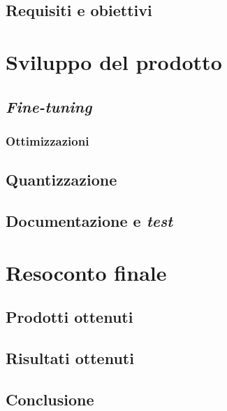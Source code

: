     \subsection{Requisiti e obiettivi}


\section{Sviluppo del prodotto}
    \subsection{\textit{Fine-tuning}}
        \subsubsection{Ottimizzazioni}
    \subsection{Quantizzazione}
    \subsection{Documentazione e \textit{test}}

\section{Resoconto finale}
    \subsection{Prodotti ottenuti}
    \subsection{Risultati ottenuti}
    \subsection{Conclusione}

\newpage